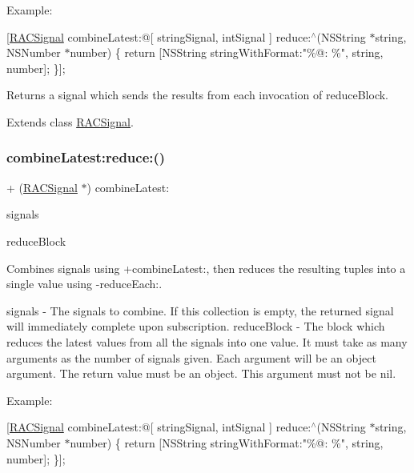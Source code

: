 Example\+:

\mbox{[}\mbox{\hyperlink{interface_r_a_c_signal}{R\+A\+C\+Signal}} combine\+Latest\+:@\mbox{[} string\+Signal, int\+Signal \mbox{]} reduce\+:$^\wedge$(N\+S\+String $\ast$string, N\+S\+Number $\ast$number) \{ return \mbox{[}N\+S\+String string\+With\+Format\+:"\%@\+: \%", string, number\mbox{]}; \}\mbox{]};

Returns a signal which sends the results from each invocation of {\ttfamily reduce\+Block}. 

Extends class \mbox{\hyperlink{interface_r_a_c_signal_a5e4d2db914a14c415646d9fdda131221}{R\+A\+C\+Signal}}.

\mbox{\label{category_r_a_c_signal_07_operations_08_a5e4d2db914a14c415646d9fdda131221}} 
\subsubsection{\texorpdfstring{combine\+Latest\+:reduce\+:()}{combineLatest:reduce:()}\hspace{0.1cm}{\footnotesize\ttfamily [2/3]}}
{\footnotesize\ttfamily + (\mbox{\hyperlink{interface_r_a_c_signal}{R\+A\+C\+Signal}} $\ast$) combine\+Latest\+: \begin{DoxyParamCaption}\item[{(id$<$ N\+S\+Fast\+Enumeration $>$)}]{signals }\item[{reduce:(id($^\wedge$)())}]{reduce\+Block }\end{DoxyParamCaption}}

Combines signals using +combine\+Latest\+:, then reduces the resulting tuples into a single value using -\/reduce\+Each\+:.

signals -\/ The signals to combine. If this collection is empty, the returned signal will immediately complete upon subscription. reduce\+Block -\/ The block which reduces the latest values from all the signals into one value. It must take as many arguments as the number of signals given. Each argument will be an object argument. The return value must be an object. This argument must not be nil.

Example\+:

\mbox{[}\mbox{\hyperlink{interface_r_a_c_signal}{R\+A\+C\+Signal}} combine\+Latest\+:@\mbox{[} string\+Signal, int\+Signal \mbox{]} reduce\+:$^\wedge$(N\+S\+String $\ast$string, N\+S\+Number $\ast$number) \{ return \mbox{[}N\+S\+String string\+With\+Format\+:"\%@\+: \%", string, number\mbox{]}; \}\mbox{]};

